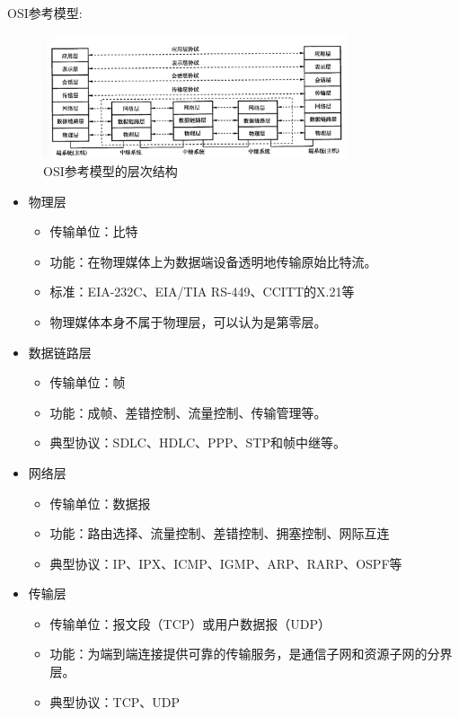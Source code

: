\documentclass[12pt, a4paper, oneside]{ctexart}
\begin{document}
OSI参考模型:
\begin{figure}
    \centering
    \includegraphics[width=0.8\textwidth]{./images/osi_structure.png}
    \caption{OSI参考模型的层次结构}
\end{figure}
\begin{itemize}
    \item 物理层
    \begin{itemize}
        \item 传输单位：比特
        \item 功能：在物理媒体上为数据端设备透明地传输原始比特流。
        \item 标准：EIA-232C、EIA/TIA RS-449、CCITT的X.21等
        \item 物理媒体本身不属于物理层，可以认为是第零层。
    \end{itemize}
    \item 数据链路层
    \begin{itemize}
        \item 传输单位：帧
        \item 功能：成帧、差错控制、流量控制、传输管理等。
        \item 典型协议：SDLC、HDLC、PPP、STP和帧中继等。
    \end{itemize}
    \item 网络层
    \begin{itemize}
        \item 传输单位：数据报
        \item 功能：路由选择、流量控制、差错控制、拥塞控制、网际互连
        \item 典型协议：IP、IPX、ICMP、IGMP、ARP、RARP、OSPF等
    \end{itemize}
    \item 传输层
    \begin{itemize}
        \item 传输单位：报文段（TCP）或用户数据报（UDP）
        \item 功能：为端到端连接提供可靠的传输服务，是通信子网和资源子网的分界层。
        \item 典型协议：TCP、UDP

\end{itemize}
\end{itemize}
\end{document}
